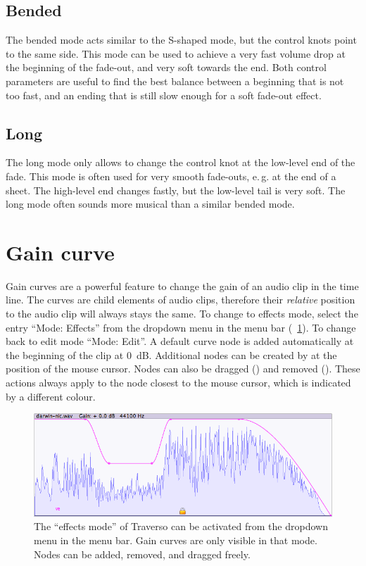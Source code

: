 \subsection{Bended}
The bended mode acts similar to the S-shaped mode, but the control knots point to the same side. This mode can be used to achieve a very fast volume drop at the beginning of the fade-out, and very soft towards the end. Both control parameters are useful to find the best balance between a beginning that is not too fast, and an ending that is still slow enough for a soft fade-out effect.

\subsection{Long}
The long mode only allows to change the control knot at the low-level end of the fade. This mode is often used for very smooth fade-outs, e.\,g. at the end of a sheet. The high-level end changes fastly, but the low-level tail is very soft. The long mode often sounds more musical than a similar bended mode.

\section{Gain curve}
Gain curves are a powerful feature to change the gain of an audio clip in the time line. The curves are child elements of audio clips, therefore their \emph{relative} position to the audio clip will always stays the same. To change to effects mode, select the entry ``Mode: Effects'' from the dropdown menu in the menu bar (\FigB~\ref{fig_gcurve01}). To change back to edit mode ``Mode: Edit''. A default curve node is added automatically at the beginning of the clip at 0~dB. Additional nodes can be created by  at the position of the mouse cursor. Nodes can also be dragged () and removed (). These actions always apply to the node closest to the mouse cursor, which is indicated by a different colour.

\begin{figure}[t]
 \centering\includegraphics[width=\textwidth]{images/gcurve01}
 \caption{The ``effects mode'' of Traverso can be activated from the dropdown menu in the menu bar. Gain curves are only visible in that mode. Nodes can be added, removed, and dragged freely.}
 \label{fig_gcurve01}
\end{figure}

